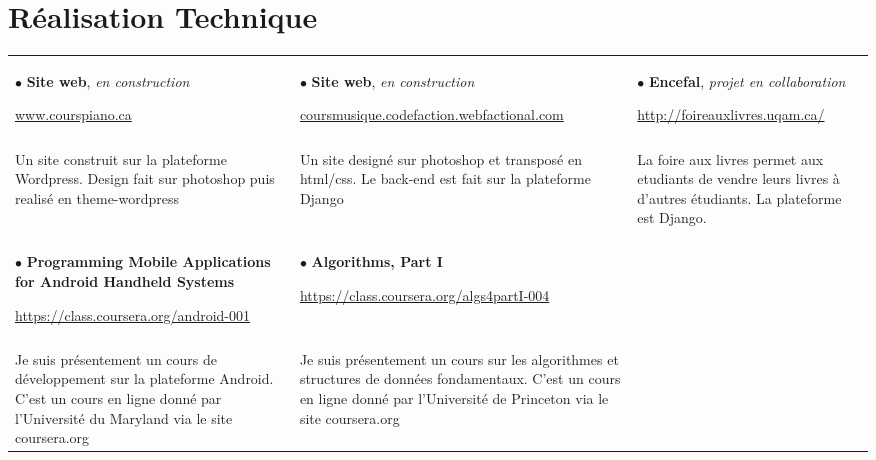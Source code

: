 \documentclass[a4paper,10pt]{extarticle}
\begin{document}
\section{Réalisation Technique}

\begin{tabular*}{\linewidth}{  
                   p{ } 
                   p{ }  
                   p{ } 
                   } 
$\bullet$ \textbf{Site web}, \textsl{en construction} \par  \href{www.courspiano.ca}{www.courspiano.ca} 

&$\bullet$ \textbf{Site web}, \textsl{en construction} \par \small\href{http://coursmusique.codefaction.webfactional.com}{coursmusique.codefaction.webfactional.com}
&$\bullet$ \textbf{Encefal}, \textsl{projet en collaboration} \par \href{http://foireauxlivres.uqam.ca/}{http://foireauxlivres.uqam.ca/} \tabularnewline \\


\vspace{-1.4em}Un site construit sur la plateforme Wordpress. Design fait sur photoshop puis realisé en theme-wordpress
& \vspace{-1.5em} Un site designé sur photoshop et transposé en html/css. Le back-end est fait sur la plateforme Django  
&\vspace{-1.5em} La foire aux livres permet aux etudiants de vendre leurs livres à d'autres étudiants. La plateforme est Django. 
\tabularnewline \\

$\bullet$ \textbf{Programming Mobile Applications for Android Handheld Systems} \par \small \href{https://class.coursera.org/android-001}{https://class.coursera.org/android-001}


&$\bullet$ \textbf{Algorithms, Part I} \par \small \href{https://class.coursera.org/algs4partI-004}{https://class.coursera.org/algs4partI-004} 


& \tabularnewline \\
\vspace{-1.5em} Je suis présentement un cours de développement sur la plateforme Android. C'est un cours en ligne donné par l'Université du Maryland via le site coursera.org

& \vspace{-1.5em} Je suis présentement un cours sur les algorithmes et structures de données fondamentaux. C'est un cours en ligne donné par l'Université de Princeton via le site coursera.org



\end{tabular*}   
\end{document}
